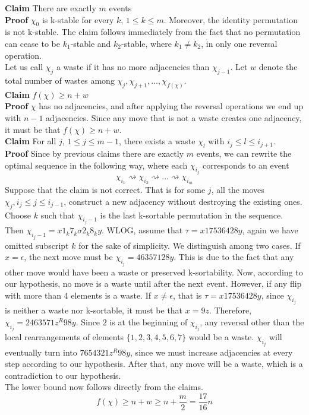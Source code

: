 \textbf{Claim} There are exactly $m$ events \\
\textbf{Proof} $\chi_0$ is k-stable for every $k$, $1 \leq k \leq m$. Moreover, the identity permutation is not k-stable. The claim follows immediately from the fact that no permutation can cease to be $k_{1}$-stable and $k_{2}$-stable, where $k_1 \neq k_2$, in only one reversal operation. \\

Let us call $\chi_j$ a waste if it has no more adjacencies than $\chi_{j-1}$. Let $w$ denote the total number of wastes among $\chi_j, \chi_{j+1}, \ldots ,\chi_{f(\chi)}$. \\

\textbf{Claim} $f(\chi) \geq n + w$\\ 
\textbf{Proof} $\chi$ has no adjacencies, and after applying the reversal operations we end up with $n - 1$ adjacencies. Since any move that is not a waste creates one adjacency, it must be that $f(\chi) \geq n + w$.  \\

\textbf{Claim} For all $j$, $1 \leq j \leq m - 1$, there exists a waste $\chi_l$ with $i_j \leq l \leq i_{j+1}$.\\ 
\textbf{Proof} Since by previous claims there are exactly $m$ events, we can rewrite the optimal sequence in the following way, where each $\chi_{i_j}$ corresponds to an event 
\[
\chi_{i_1} \rightsquigarrow \chi_{i_2} \rightsquigarrow \ldots \rightsquigarrow \chi_{i_m}
\]
Suppose that the claim is not correct. That is for some $j$, all the moves $\chi_{j}, i_{j} \leq j \leq i_{j-1}$, construct a new adjacency without destroying the existing ones. Choose $k$ such that $\chi_{i_j-1}$ is the last k-sortable permutation in the sequence. Then $\chi_{i_j-1}=x1_k7_k\sigma2_k8_ky$. WLOG, assume that $\tau=x17536428y$, again we have omitted subscript $k$ for the sake of simplicity. We distinguish among two cases. If $x = \epsilon$, the next move must be $\chi_{i_j}=46357128y$. This is due to the fact that any other move would have been a waste or preserved k-sortability. Now, according to our hypothesis, no move is a waste until after the next event. However, if any flip with more than 4 elements is a waste. If $x \neq \epsilon$, that is $\tau=x17536428y$, since $\chi_{i_j}$ is neither a waste nor k-sortable, it must be that $x = 9z$. Therefore, $\chi_{i_j}=2463571z^{R}98y$. Since $2$ is at the beginning of $\chi_{i_j}$, any reversal other than the local rearrangements of elements $\lbrace 1, 2, 3, 4, 5, 6, 7 \rbrace $ would be a waste. $\chi_{i_j}$ will eventually turn into $7654321z^{R}98y$, since we must increase adjacencies at every step according to our hypothesis. After that, any move will be a waste, which is a contradiction to our hypothesis. \\

The lower bound now follows directly from the claims. 
\[
f(\chi) \geq n+w \geq n+\frac{m}{2}=\frac{17}{16}n
\]
